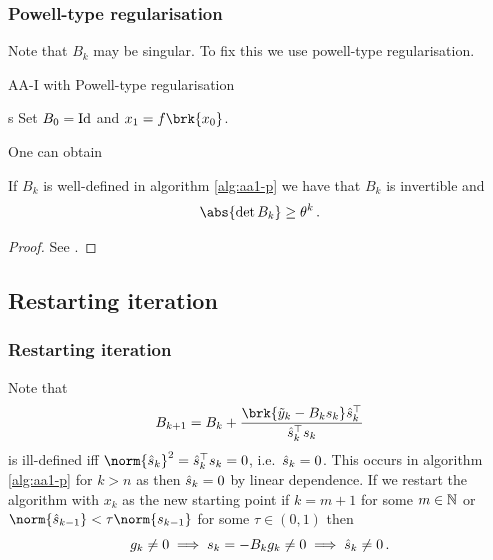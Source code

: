 \begin{frame}	
	\frametitle{Powell-type regularisation}
	Note that $B_k$ may be singular. To fix this we use powell-type regularisation.
	\begin{algorithm}[H]
	\caption{AA-I with Powell-type regularisation}\label{alg:aa1-p}
	\color{gray}
s	
	\BlankLine
	Set $B_0=\operatorname{Id}$ and $x_1=f\brk{x_0}$.
	
	\end{algorithm}	
\end{frame}

\begin{frame}
	One can obtain
	\begin{lemma}
		If $B_k$ is well-defined in algorithm \ref{alg:aa1-p} we have that $B_k$ is invertible and $$\abs{\det B_k}\geq \theta^k\,.$$
	\end{lemma}
	\begin{proof}
		See \cite[Lemma 2]{ZhaAA}.
	\end{proof}
\end{frame}

\subsection{Restarting iteration}
\begin{frame}
	\frametitle{Restarting iteration}
	Note that
	\begin{align*}
		B_{k+1} = B_k+\frac{\brk{\tiy_k-B_ks_k}\hs_k^\top}{\hs_k^\top s_k}
	\end{align*}
	is ill-defined iff $\norm{\hs_k}^2=\hs_k^\top s_k=0$, i.e.\ $\hat{s}_k=0$. This occurs in algorithm \ref{alg:aa1-p} for $k>n$ as then $\hat{s}_k=0$ by linear dependence.
	If we restart the algorithm with $x_k$ as the new starting point if $k=m+1$ for some $m\in\mathbb{N}$ or $\norm{\hs_{k-1}}<\tau\norm{s_{k-1}}$ for some $\tau\in(0,1)$
	then 
	$$g_k\neq 0 \implies s_k=-B_kg_k\neq 0\implies \hat{s}_k\neq 0\,.$$
\end{frame}


